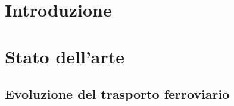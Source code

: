 \documentclass[a4paper,12pt]{report}
\begin{document}
\chapter*{Introduzione}


\chapter{Stato dell’arte}

\section{Evoluzione del trasporto ferroviario}
\end{document}
